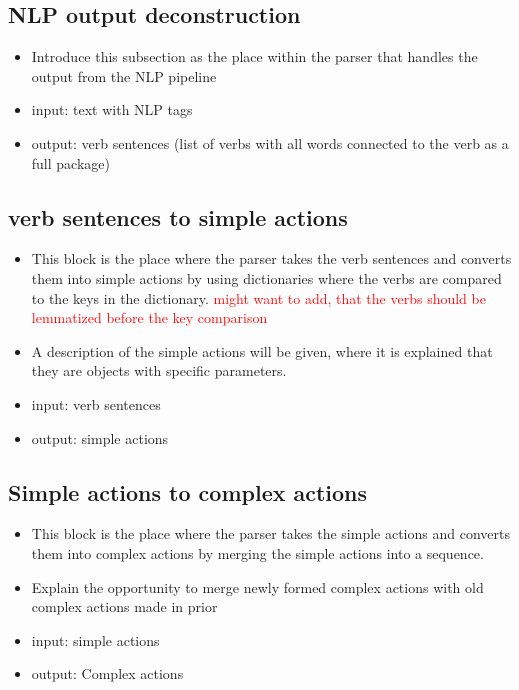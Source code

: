 \subsection{NLP output deconstruction}\label{esc:Integration_decon}
\begin{itemize}
    \item Introduce this subsection as the place within the parser that handles the output from the NLP pipeline
    \item input: text with NLP tags
    \item output: verb sentences (list of verbs with all words connected to the verb as a full package)
\end{itemize}


\subsection{verb sentences to simple actions}\label{esc:Integration_parse_VS_SA}
\begin{itemize}
    \item This block is the place where the parser takes the verb sentences and converts them into simple actions by using dictionaries where the verbs are compared to the keys in the dictionary. \textcolor{red}{might want to add, that the verbs should be lemmatized before the key comparison}
    \item A description of the simple actions will be given, where it is explained that they are objects with specific parameters.
    \item input: verb sentences
    \item output: simple actions
\end{itemize}

\subsection{Simple actions to complex actions}\label{esc:Integration_parse_SA_CA}
\begin{itemize}
    \item This block is the place where the parser takes the simple actions and converts them into complex actions by merging the simple actions into a sequence.
    \item Explain the opportunity to merge newly formed complex actions with old complex actions made in prior
    \item input: simple actions
    \item output: Complex actions
\end{itemize}

